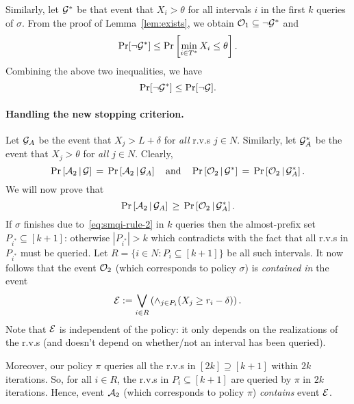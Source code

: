 \documentclass[11pt]{article}
\theoremstyle{remark}
\theoremstyle{plain}
\theoremstyle{remark}
\begin{document}
Similarly, let ${\cal G}^*$ be that event that $X_i>\theta$ for all intervals $i$ in the first $k$ queries of $\sigma$. From the proof of Lemma~\ref{lem:exists}, we obtain ${\cal O}_1\subseteq \neg {\cal G}^*$ and 
\begin{equation*}
\Pr[\neg {\cal G}^*] \le   \Pr\left[\min_{i \in T^*} X_i  \le  \theta\right] .
\end{equation*}
Combining the above two inequalities, we have 
\begin{equation}\label{eq:smqi-old}
    \Pr[\neg {\cal G}^*] \le\Pr[\neg {\cal G}].
\end{equation}

\paragraph{Handling the new stopping criterion.} Let ${\cal G}_A$ be the event that $X_j>L+\delta$ for {\em all} r.v.s $j\in N$. Similarly, let ${\cal G}^*_A$ be the event that $X_j>\theta$ for {\em  all}  $j\in N$. Clearly,
\begin{equation}
    \label{eq:smqi-analyze0}
\Pr\left[{\cal A}_2\, |\, {\cal G}\right]  \,=\, \Pr\left[{\cal A}_2\, |\,  {\cal G}_A\right] \quad \text{and} \quad \Pr\left[{\cal O}_2\, |\, {\cal G}^*\right]  \,=\, \Pr\left[{\cal O}_2\, |\,  {\cal G}^*_A\right]. \end{equation}
  We will now prove that
 \begin{equation}\label{eq:smqi-analyze1}
 \Pr\left[{\cal A}_2\, |\, {\cal G}_A\right] \,\ge\,  \Pr\left[{\cal O}_2\, | \, {\cal G}^*_A\right].
\end{equation} 
If $\sigma$ finishes due to~\eqref{eq:smqi-rule-2} in $k$ queries then the almost-prefix set $P_{i^*}\subseteq  [k+1]$: otherwise   $|P_{i^*}|>k$ which  contradicts with the fact that all r.v.s in $P_{i^*} $ must be queried. Let $R=\{i\in N: P_i\subseteq [k+1]\}$ be all such intervals. It now follows that the event ${\cal O}_2$ (which corresponds to policy $\sigma$) is {\em contained in} the  event
\begin{equation}\label{eq:event-E}
    {\cal E} := \bigvee_{i\in R}  \left( \wedge_{j\in P_i} (X_j \ge r_i-\delta)\right) .
    \end{equation}
Note that ${\cal E}$ is independent of the policy: it only depends on the realizations of the r.v.s (and doesn't depend on whether/not an interval  has been queried).

Moreover, our policy $\pi$ queries all the r.v.s in $[2k] \supseteq [k+1]$ within $2k$ iterations. So, for all $i\in R$, the r.v.s in $P_i\subseteq [k+1]$ are queried by $\pi$ in $2k$ iterations. Hence,  event ${\cal A}_2$ (which corresponds to policy $\pi$) {\em contains}   event ${\cal E}$.
\end{document}
